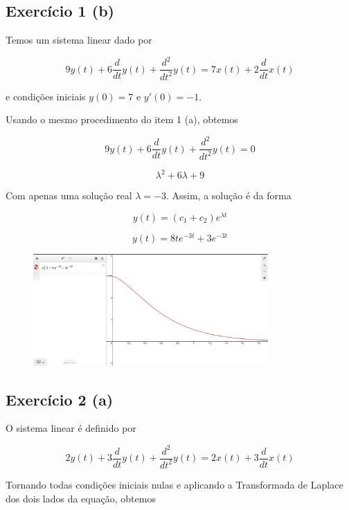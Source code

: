 \documentclass[12pt]{scrartcl}
\begin{document}
\subsection*{Exercício 1 (b)}

Temos um sistema linear dado por

\[  9 y{\left(t \right)} + 6 \frac{d}{d t} y{\left(t \right)} + \frac{d^{2}}{d t^{2}} y{\left(t \right)} = 7 x{\left(t \right)} + 2 \frac{d}{d t} x{\left(t \right)} \]

e condições iniciais $y(0) = 7$ e $y'(0) = -1$.

Usando o mesmo procedimento do item 1 (a), obtemos 

\[  9 y{\left(t \right)} + 6 \frac{d}{d t} y{\left(t \right)} + \frac{d^{2}}{d t^{2}} y{\left(t \right)} =  0 \]

\[ \lambda^{2} + 6 \lambda + 9 \]

Com apenas uma solução real $\lambda = -3$. Assim, a solução é da forma 

\[ y(t) = \left( c_1 + c_2 \right) e^{\lambda t}  \]

\[ y(t) = 8 t e^{- 3 t} + 3 e^{- 3 t} \]

\begin{figure}[h!]
	\begin{center}
    \includegraphics[width=0.8\textwidth,trim=1 1 1 1,clip]{ativ2-1b.png}
	\end{center}
\end{figure}

\subsection*{Exercício 2 (a)}

O sistema linear é definido por 

\[ 2 y{\left(t \right)} + 3 \frac{d}{d t} y{\left(t \right)} + \frac{d^{2}}{d t^{2}} y{\left(t \right)} = 2 x{\left(t \right)} + 3 \frac{d}{d t} x{\left(t \right)} \]

Tornando todas condições iniciais nulas e aplicando a Transformada de Laplace dos dois lados da equação, obtemos 
\end{document}
